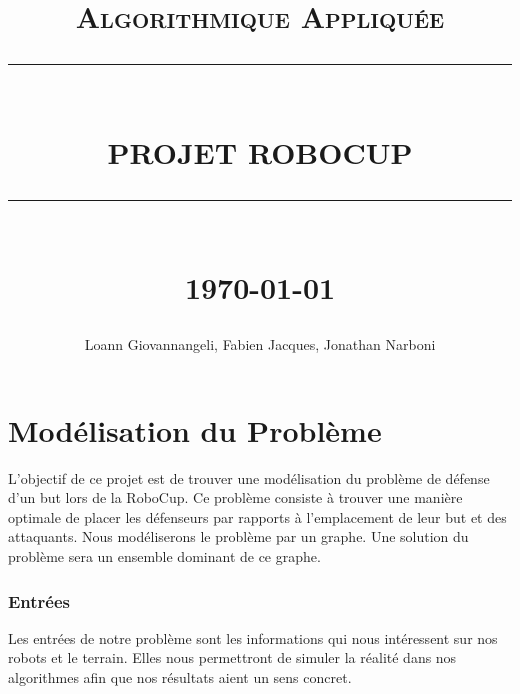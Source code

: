 \documentclass[12pt]{article}
\newcommand{\HRule}[1]{\rule{\linewidth}{#1}}
\begin{document}
\title{ \normalsize \textsc{Algorithmique Appliquée}
		\\ [2.0cm]
		\HRule{0.5pt} \\
		\LARGE \textbf{\uppercase{Projet RoboCup}}
		\HRule{2pt} \\ [0.5cm]
		\normalsize \today \vspace*{5\baselineskip}}

\date{}

\author{
		Loann Giovannangeli, Fabien Jacques, Jonathan Narboni}

\maketitle
\renewcommand{\contentsname}{Sommaire}
\newpage
\tableofcontents
\newpage

\sectionfont{\scshape}

\part{Modélisation du Problème}

L'objectif de ce projet est de trouver une modélisation du problème de défense d'un but lors de la RoboCup. Ce problème consiste à trouver une manière optimale de placer les défenseurs par rapports à l'emplacement de leur but et des attaquants. Nous modéliserons le problème par un graphe. Une solution du problème sera un ensemble dominant de ce graphe.


\section{Entrées}
Les entrées de notre problème sont les informations qui nous intéressent sur nos robots et le terrain. Elles nous permettront de simuler la réalité dans nos algorithmes afin que nos résultats aient un sens concret.\\
\end{document}
